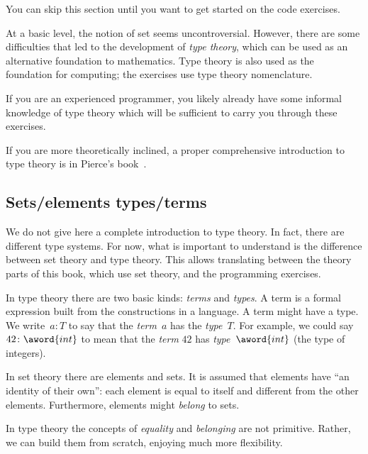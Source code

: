 
\begin{remark}
    You can skip this section until you want to get started on the code exercises.
\end{remark}

At a basic level, the notion of set seems uncontroversial.
However, there are some difficulties that led to the development of \emph{type theory}, which can be used as an alternative foundation to mathematics.
Type theory is also used as the foundation for computing; the exercises use type theory nomenclature.

If you are an experienced programmer, you likely already have some informal knowledge of type theory which will be sufficient to carry you through these exercises.


If you are more theoretically inclined, a proper comprehensive introduction to type theory is in Pierce's book~\cite{pierce02types}.

\subsection{Sets/elements \vs types/terms}

We do not give here a complete introduction to type theory.
In fact, there are different type systems.
For now, what is important to understand is the difference between set theory and type theory.
This allows translating between the theory parts of this book, which use set theory, and the programming exercises.

In type theory there are two basic kinds: \emph{terms} and \emph{types}.
A term is a formal expression built from the constructions in a language.
A term might have a type.
We write~$a \colon T$ to say that the \emph{term}~$a$ has the \emph{type}~$T$.
For example, we could say~$42 \colon \aword{int}$ to mean that the \emph{term} $42$ has \emph{type}~$\aword{int}$ (the type of integers).

In set theory there are elements and sets.
It is assumed that elements have ``an identity of their own'': each element is equal to itself and different from the other elements.
Furthermore, elements might \emph{belong} to sets.

In type theory the concepts of \emph{equality} and \emph{belonging} are not primitive.
Rather, we can build them from scratch, enjoying much more flexibility.

